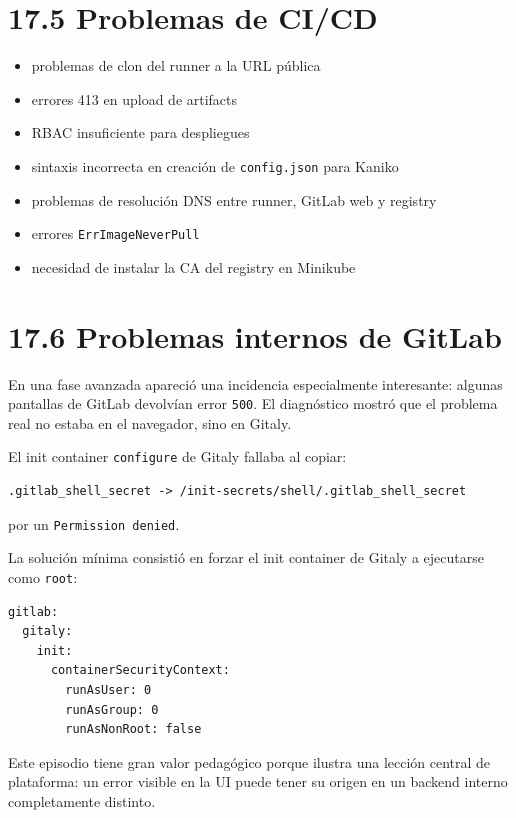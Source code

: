 \documentclass[
a4paper,
12pt]{report}
\providecommand{\tightlist}{%
  \setlength{\itemsep}{0pt}\setlength{\parskip}{0pt}}
\begin{document}
\section{17.5 Problemas de CI/CD}\label{problemas-de-cicd}

\begin{itemize}
\tightlist
\item
  problemas de clon del runner a la URL pública
\item
  errores 413 en upload de artifacts
\item
  RBAC insuficiente para despliegues
\item
  sintaxis incorrecta en creación de \texttt{config.json} para Kaniko
\item
  problemas de resolución DNS entre runner, GitLab web y registry
\item
  errores \texttt{ErrImageNeverPull}
\item
  necesidad de instalar la CA del registry en Minikube
\end{itemize}

\section{17.6 Problemas internos de
GitLab}\label{problemas-internos-de-gitlab}

En una fase avanzada apareció una incidencia especialmente interesante:
algunas pantallas de GitLab devolvían error \texttt{500}. El diagnóstico
mostró que el problema real no estaba en el navegador, sino en Gitaly.

El init container \texttt{configure} de Gitaly fallaba al copiar:

\begin{verbatim}
.gitlab_shell_secret -> /init-secrets/shell/.gitlab_shell_secret
\end{verbatim}

por un \texttt{Permission\ denied}.

La solución mínima consistió en forzar el init container de Gitaly a
ejecutarse como \texttt{root}:

\begin{verbatim}
gitlab:
  gitaly:
    init:
      containerSecurityContext:
        runAsUser: 0
        runAsGroup: 0
        runAsNonRoot: false
\end{verbatim}

Este episodio tiene gran valor pedagógico porque ilustra una lección
central de plataforma: un error visible en la UI puede tener su origen
en un backend interno completamente distinto.
\end{document}
